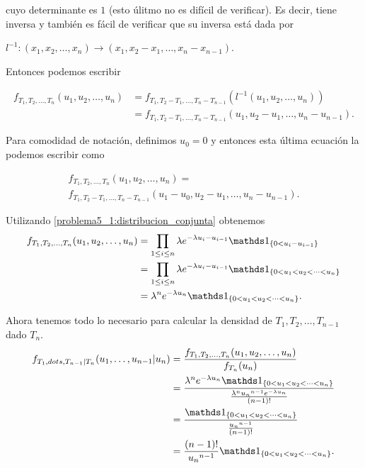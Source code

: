 cuyo determinante es $1$ (esto úlitmo no es difícil de verificar). Es decir, tiene inversa y también es 
fácil de verificar que su inversa está dada por\par 
$l^{-1}: (x_1, x_2, \dots, x_n) \longrightarrow (x_1, x_2-x_1, \dots, x_n - x_{n-1})$.\pn

Entonces podemos escribir

\begin{align}
    f_{T_1, T_2, \dots, T_n}(u_1, u_2, \dots, u_n)  &=  f_{T_1, T_2 - T_1, \dots, T_n - T_{n-1}}(l^{-1}(u_1, u_2, \dots, u_n))      \\
                                                    &=  f_{T_1, T_2 - T_1, \dots, T_n - T_{n-1}}(u_1, u_2-u_1, \dots, u_n - u_{n-1}).
\end{align}\pn

Para comodidad de notación, definimos $u_0 = 0$ y entonces esta última ecuación la podemos escribir como

\begin{align}
    f_{T_1, T_2, \dots, T_n}(u_1, u_2, \dots, u_n) =                                    \\  
    f_{T_1, T_2 - T_1, \dots, T_n - T_{n-1}}(u_1 - u_0, u_2-u_1, \dots, u_n - u_{n-1}).
\end{align}\pn

Utilizando \eqref{problema5_1:distribucion_conjunta} obtenemos
\begin{align}
    f_{T_1, T_2, \dots, T_n}(u_1, u_2, \dots, u_n)  &=  \prod_{1 \leq i \leq n} \lambda e^{-\lambda u_i - u_{i-1}} \indic_{\{ 0 < u_i - u_{i-1}\}}              \\
                                                    &=  \prod_{1 \leq i \leq n} \lambda e^{-\lambda u_i - u_{i-1}} \indic_{\{ 0 < u_1 < u_2< \dots <u_{n}\}}    \\
                                                    &=  \lambda^n e^{-\lambda u_n} \indic_{\{ 0 < u_1 < u_2< \dots <u_{n}\}}.                                   
\end{align}\pn

Ahora tenemos todo lo necesario para calcular la densidad de $T_1, T_2, \dots, T_{n-1}$ dado $T_n$.
\begin{align}
    f_{T_1, dots, T_{n-1} | T_n} (u_1, \dots, u_{n-1} | u_n)    &=  \frac{f_{T_1, T_2, \dots, T_n}(u_1, u_2, \dots, u_n)}{f_{T_n}(u_n)}             \\
                                                                &=  \frac{\lambda^n e^{-\lambda u_n} \indic_{\{ 0 < u_1 < u_2< \dots <u_{n}\}}}
                                                                    {\frac{ \lambda^{n} {u_n}^{n-1} e^{- \lambda u_n}}{(n-1)!}}                     \\
                                                                &=  \frac{ \indic_{\{ 0 < u_1 < u_2< \dots <u_{n}\}}}
                                                                    {\frac{ {u_n}^{n-1} }{(n-1)!}}                                                  \\
                                                                &=  \frac{(n-1)!}{{u_n}^{n-1}} \indic_{\{ 0 < u_1 < u_2< \dots <u_{n}\}}.
\end{align}\pn

